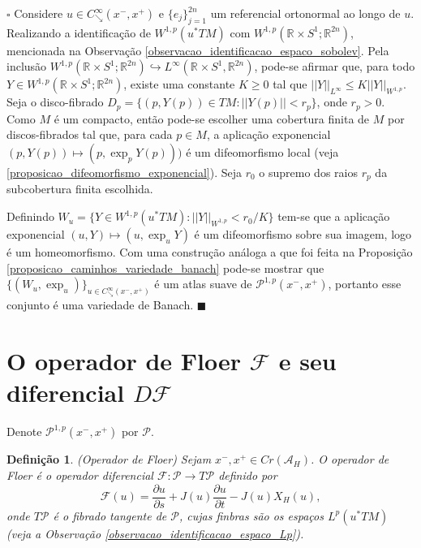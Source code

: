 \documentclass[12pt]{book}
\newtheorem{definicao}[teorema]{Definição}
\newenvironment{prova}[1]{$\square$ #1}{\hfill$\blacksquare$}
\newcommand{\caminhosdecaimentoexponencial}[2]{C^{\infty}_{\searrow}(#1, #2)}
\newcommand{\caminhosdecaimentoexponencialpadrao}{\caminhosdecaimentoexponencial{x^{-}}{x^{+}}}
\newcommand{\caminhosexponenciaisconectantesabrev}{\mathcal{P}}
\newcommand{\caminhosexponenciaisconectantes}[2]{\mathcal{P}^{1,p}(#1, #2)}
\newcommand{\caminhosexponenciaisconectantespadrao}{\caminhosexponenciaisconectantes{x^{-}}{x^{+}}}
\newcommand{\circulo}{S^{1}}
\newcommand{\diferencialfloer}{D\operadorFloer}
\newcommand{\derivadaparcial}[2]{\frac{\partial #1}{\partial #2}}
\newcommand{\espacoLp}[1]{L^{p}(#1)}
\newcommand{\espacosobolev}[1]{W^{1,p}(#1)}
\newcommand{\espacosobolevcontradominio}[2]{W^{1,p}(#1;#2)}
\newcommand{\funcionalH}{\mathcal{A}_{H}}
\newcommand{\operadorFloer}{\mathcal{F}}
\newcommand{\operadorFloerDefinicao}[1]{\derivadaparcial{#1}{s} + J(#1)\derivadaparcial{#1}{t} - J(#1)X_{H}(#1)}
\newcommand{\operadorFloerParametro}[1]{\mathcal{F}(#1)}
\newcommand{\norma}[1]{||#1||}
\newcommand{\normaWp}[1]{||#1||_{W^{1,p}}}
\newcommand{\pontoscriticos}[1]{\textit{Cr}(#1)}
\newcommand{\pullbackfibradotangente}[2]{#1^{*}T#2}
\newcommand{\pullbackfibradotangenteM}[1]{\pullbackfibradotangente{#1}{M}}
\newcommand{\retacartesianocirculo}{\real{} \times \circulo}
\newcommand{\real}[1]{\mathbb{R}^{#1}}
\begin{document}
	\begin{prova}
		Considere $u \in \caminhosdecaimentoexponencialpadrao$ e $\{e_{j}\}_{j=1}^{2n}$ um referencial ortonormal ao longo de $u$.  Realizando a identificação de  $\espacosobolev{\pullbackfibradotangenteM{u}}$ com $\espacosobolevcontradominio{\retacartesianocirculo}{\real{2n}}$, mencionada na Observação \ref{observacao_identificacao_espaco_sobolev}. Pela inclusão $\espacosobolevcontradominio{\retacartesianocirculo}{\real{2n}} \hookrightarrow L^{\infty}(\retacartesianocirculo, \real{2n})$, pode-se afirmar que, para todo $Y \in \espacosobolevcontradominio{\retacartesianocirculo}{\real{2n}}$, existe uma constante $K\geq 0$ tal que $\norma{Y}_{L^{\infty}} \leq K\normaWp{Y}$. Seja o disco-fibrado $D_{p}=\{(p, Y(p))\in TM: \norma{Y(p)}<r_{p} \}$, onde $r_{p}>0$. Como $M $ é um compacto, então pode-se escolher uma cobertura finita de $M$ por discos-fibrados tal que, para cada $p \in M$, a aplicação exponencial $(p,Y(p))\mapsto (p, \exp_{p}Y(p)))$ é um difeomorfismo local (veja \ref{proposicao_difeomorfismo_exponencial}). Seja $r_{0}$ o supremo dos raios $r_{p}$ da subcobertura finita escolhida. 
		
		Definindo $W_{u} = \{Y\in \espacosobolev{\pullbackfibradotangenteM{u}}:\normaWp{Y} < r_{0}/K\}$ tem-se que a aplicação exponencial $(u, Y) \mapsto (u, \exp_{u}Y)$ é um difeomorfismo sobre sua imagem, logo é um homeomorfismo. Com uma construção análoga a que foi feita na Proposição \ref{proposicao_caminhos_variedade_banach} pode-se mostrar que $\{(W_{u}, \exp_{u})\}_{u \in \caminhosdecaimentoexponencialpadrao}$ é um atlas suave de $\caminhosexponenciaisconectantespadrao$, portanto esse conjunto é uma variedade de Banach. 
	\end{prova}
	
	\section{O operador de Floer $\operadorFloer$ e seu diferencial $\diferencialfloer$}\label{secao_operador_floer}
	
	Denote $\caminhosexponenciaisconectantespadrao$ por $\caminhosexponenciaisconectantesabrev$.
	
	\begin{definicao}\label{definicao_operador_floer}
		(Operador de Floer) Sejam $x^{-}, x^{+}\in \pontoscriticos{\funcionalH}$. O operador de Floer é o operador diferencial $\operadorFloer: \caminhosexponenciaisconectantesabrev \to T\caminhosexponenciaisconectantesabrev$ definido por
		$$
		\operadorFloerParametro{u} =\operadorFloerDefinicao{u},
		$$
		onde $T\caminhosexponenciaisconectantesabrev$ é o fibrado tangente de $\caminhosexponenciaisconectantesabrev$, cujas finbras são os espaços $\espacoLp{\pullbackfibradotangenteM{u}	}$ (veja a Observação \ref{observacao_identificacao_espaco_Lp}).
	\end{definicao}
	
\end{document}
